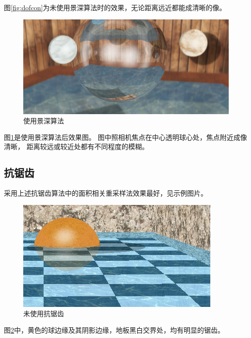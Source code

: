 图\ref{fig:dofcon}为未使用景深算法时的效果，无论距离远近都能成清晰的像。

\begin{figure}[!htbp]
    \centering
    \includegraphics[width=\columnwidth]{dof2}
    \caption{使用景深算法}\label{fig:dof}
\end{figure}

图\ref{fig:dof}是使用景深算法后效果图。%
图中照相机焦点在中心透明球心处，焦点附近成像清晰，%
距离较远或较近处都有不同程度的模糊。

\subsection{抗锯齿}
采用上述抗锯齿算法中的面积相关重采样法效果最好，见示例图片。

\begin{figure}[!htbp]
    \centering
    \includegraphics[width=\columnwidth]{org}
    \caption{未使用抗锯齿}\label{fig:aa0con}
\end{figure}

图\ref{fig:aa0con}中，黄色的球边缘及其阴影边缘，地板黑白交界处，均有明显的锯齿。

